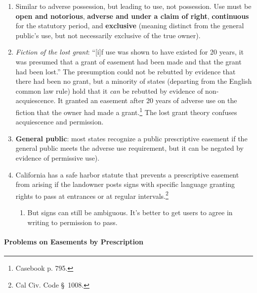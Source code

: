 \begin{enumerate}
    \item Similar to adverse possession, but leading to use, not possession. 
    Use must be \textbf{open and notorious}, \textbf{adverse and under a claim 
    of right}, \textbf{continuous} for the statutory period, and 
    \textbf{exclusive} (meaning distinct from the general public's use, but 
    not necessarily exclusive of the true owner).
    \item \emph{Fiction of the lost grant}: ``[i]f use was shown to have 
    existed for 20 years, it was presumed that a grant of easement had been 
    made and that the grant had been lost.'' The presumption could not be 
    rebutted by evidence that there had been no grant, but a minority of 
    states (departing from the English common law rule) hold that it 
    \emph{can} be rebutted by evidence of non-acquiescence. It granted an 
    easement after 20 years of adverse use on the fiction that the owner had 
    made a grant.\footnote{Casebook p. 795.} The lost grant theory confuses 
    acquiescence and permission.
    \item \textbf{General public}: most states recognize a public prescriptive 
    easement if the general public meets the adverse use requirement, but it 
    can be negated by evidence of permissive use).
    \item California has a safe harbor statute that prevents a prescriptive 
    easement from arising if the landowner posts signs with specific language 
    granting rights to pass at entrances or at regular intervals.\footnote{Cal 
    Civ. Code \S\ 1008.}
    \begin{enumerate}
        \item But signs can still be ambiguous. It's better to get users to 
        agree in writing to permission to pass.
    \end{enumerate}
\end{enumerate}

\paragraph{Problems on Easements by Prescription}

